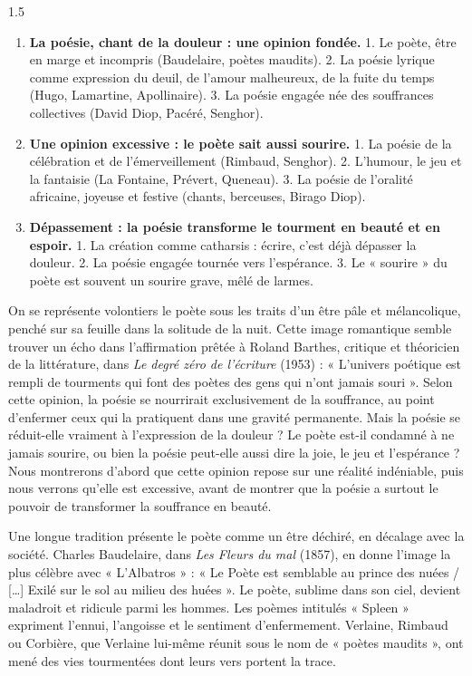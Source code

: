 \documentclass[12pt]{article}
\begin{document}
\begin{spacing}{1.5}
\begin{enumerate}
\item[I.] \textbf{La poésie, chant de la douleur : une opinion fondée.}
  1. Le poète, être en marge et incompris (Baudelaire, poètes maudits). 2. La poésie lyrique comme expression du deuil, de l'amour malheureux, de la fuite du temps (Hugo, Lamartine, Apollinaire). 3. La poésie engagée née des souffrances collectives (David Diop, Pacéré, Senghor).
\item[II.] \textbf{Une opinion excessive : le poète sait aussi sourire.}
  1. La poésie de la célébration et de l'émerveillement (Rimbaud, Senghor). 2. L'humour, le jeu et la fantaisie (La Fontaine, Prévert, Queneau). 3. La poésie de l'oralité africaine, joyeuse et festive (chants, berceuses, Birago Diop).
\item[III.] \textbf{Dépassement : la poésie transforme le tourment en beauté et en espoir.}
  1. La création comme catharsis : écrire, c'est déjà dépasser la douleur. 2. La poésie engagée tournée vers l'espérance. 3. Le « sourire » du poète est souvent un sourire grave, mêlé de larmes.
\end{enumerate}



On se représente volontiers le poète sous les traits d'un être pâle et mélancolique, penché sur sa feuille dans la solitude de la nuit. Cette image romantique semble trouver un écho dans l'affirmation prêtée à Roland Barthes, critique et théoricien de la littérature, dans \emph{Le degré zéro de l'écriture} (1953) : « L'univers poétique est rempli de tourments qui font des poètes des gens qui n'ont jamais souri ». Selon cette opinion, la poésie se nourrirait exclusivement de la souffrance, au point d'enfermer ceux qui la pratiquent dans une gravité permanente. Mais la poésie se réduit-elle vraiment à l'expression de la douleur ? Le poète est-il condamné à ne jamais sourire, ou bien la poésie peut-elle aussi dire la joie, le jeu et l'espérance ? Nous montrerons d'abord que cette opinion repose sur une réalité indéniable, puis nous verrons qu'elle est excessive, avant de montrer que la poésie a surtout le pouvoir de transformer la souffrance en beauté.


Une longue tradition présente le poète comme un être déchiré, en décalage avec la société. Charles Baudelaire, dans \emph{Les Fleurs du mal} (1857), en donne l'image la plus célèbre avec « L'Albatros » : « Le Poète est semblable au prince des nuées / [\dots] Exilé sur le sol au milieu des huées ». Le poète, sublime dans son ciel, devient maladroit et ridicule parmi les hommes. Les poèmes intitulés « Spleen » expriment l'ennui, l'angoisse et le sentiment d'enfermement. Verlaine, Rimbaud ou Corbière, que Verlaine lui-même réunit sous le nom de « poètes maudits », ont mené des vies tourmentées dont leurs vers portent la trace.


\end{spacing}
\end{document}

